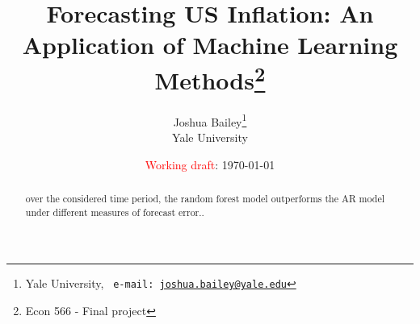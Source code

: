 
\begin{titlepage}

\title{Forecasting US Inflation: An Application of Machine Learning Methods\footnote{Econ 566 - Final project}} 
\author{Joshua Bailey\thanks{Yale University, \texttt{\ e-mail:  \href{mailto: joshua.bailey@yale.edu}{joshua.bailey@yale.edu}}
}
\\ 
\normalsize{Yale University}
}


\date{\textcolor{red}{Working draft}: \today}
\maketitle
\vspace{-20pt}
\begin{abstract}
\begin{adjustwidth}{-10pt}{-10pt}
\thispagestyle{empty}

\noindent over the considered time period, the random forest model outperforms the AR model under different measures of forecast error.. 

\end{adjustwidth}
\end{abstract}



\end{titlepage}


\pagebreak

\hypersetup{linkcolor=black}
\tableofcontents
\listoffigures
\listoftables
\hypersetup{linkcolor=blue}


 